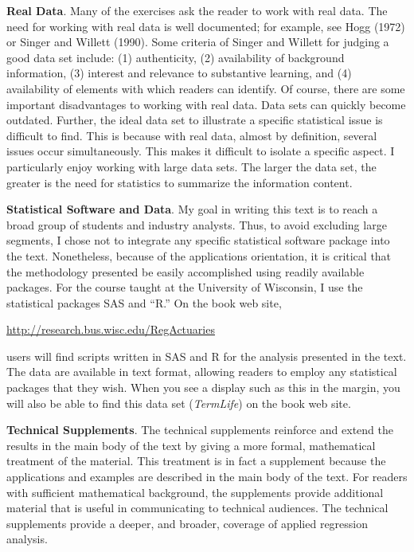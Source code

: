 \textbf{Real Data}. Many of the exercises ask the reader to work
with real data. The need for working with real data is well
documented; for example, see Hogg (1972) or Singer and Willett
(1990). Some criteria of Singer and Willett for judging a good data
set include: (1) authenticity, (2) availability of background
information, (3) interest and relevance to substantive learning, and
(4) availability of elements with which readers can identify. Of
course, there are some important disadvantages to working with real
data. Data sets can quickly become outdated. Further, the ideal data
set to illustrate a specific statistical issue is difficult to find.
This is because with real data, almost by definition, several issues
occur simultaneously. This makes it difficult to isolate a specific
aspect. I particularly enjoy working with large data sets. The
larger the data set, the greater is the need for statistics to
summarize the information content.



\textbf{Statistical Software and Data}. My goal in writing this text
is to reach a broad group of students and industry analysts. Thus,
to avoid excluding large segments, I chose not to integrate any
specific statistical software package into the text. Nonetheless,
because of the applications orientation, it is critical that the
methodology presented be easily accomplished using readily available
packages. For the course taught at the University of Wisconsin, I
use the statistical packages SAS and ``R.'' On the book web site,

\bigskip

{ \url{http://research.bus.wisc.edu/RegActuaries}}

\bigskip


\noindent users will find scripts written in SAS and R for the
analysis presented in the text. The data are available in text
format, allowing readers to employ any statistical packages that
they wish. When you see a display such as this in the margin, you
will also be able to find this data set (\emph{TermLife}) on the
book web site.

\textbf{Technical Supplements}. The technical supplements reinforce
and extend the results in the main body of the text by giving a more
formal, mathematical treatment of the material. This treatment is in
fact a supplement because the applications and examples are
described in the main body of the text. For readers with sufficient
mathematical background, the supplements provide additional material
that is useful in communicating to technical audiences. The
technical supplements provide a deeper, and broader, coverage of
applied regression analysis.

